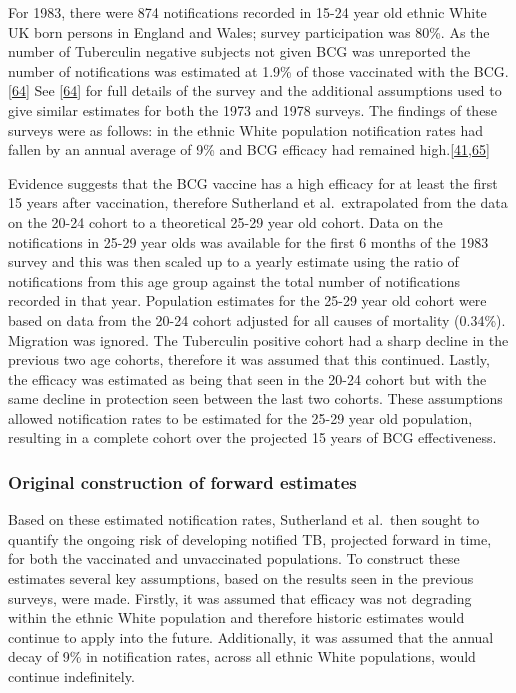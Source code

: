 \documentclass[11pt,twoside]{bristolthesis}
\begin{document}
  For 1983, there were 874 notifications recorded in 15-24 year old ethnic White UK born persons in England and Wales; survey participation was 80\%. As the number of Tuberculin negative subjects not given BCG was unreported the number of notifications was estimated at 1.9\% of those vaccinated with the BCG.{[}\protect\hyperlink{ref-Sutherland1987a}{64}{]} See {[}\protect\hyperlink{ref-Sutherland1987a}{64}{]} for full details of the survey and the additional assumptions used to give similar estimates for both the 1973 and 1978 surveys. The findings of these surveys were as follows: in the ethnic White population notification rates had fallen by an annual average of 9\% and BCG efficacy had remained high.{[}\protect\hyperlink{ref-Sutherland1989}{41},\protect\hyperlink{ref-Springett1988}{65}{]}
  
  Evidence suggests that the BCG vaccine has a high efficacy for at least the first 15 years after vaccination, therefore Sutherland et al.~extrapolated from the data on the 20-24 cohort to a theoretical 25-29 year old cohort. Data on the notifications in 25-29 year olds was available for the first 6 months of the 1983 survey and this was then scaled up to a yearly estimate using the ratio of notifications from this age group against the total number of notifications recorded in that year. Population estimates for the 25-29 year old cohort were based on data from the 20-24 cohort adjusted for all causes of mortality (0.34\%). Migration was ignored. The Tuberculin positive cohort had a sharp decline in the previous two age cohorts, therefore it was assumed that this continued. Lastly, the efficacy was estimated as being that seen in the 20-24 cohort but with the same decline in protection seen between the last two cohorts. These assumptions allowed notification rates to be estimated for the 25-29 year old population, resulting in a complete cohort over the projected 15 years of BCG effectiveness.
  
  \hypertarget{original-construction-of-forward-estimates}{%
  \subsubsection{Original construction of forward estimates}\label{original-construction-of-forward-estimates}}
  
  Based on these estimated notification rates, Sutherland et al.~then sought to quantify the ongoing risk of developing notified TB, projected forward in time, for both the vaccinated and unvaccinated populations. To construct these estimates several key assumptions, based on the results seen in the previous surveys, were made. Firstly, it was assumed that efficacy was not degrading within the ethnic White population and therefore historic estimates would continue to apply into the future. Additionally, it was assumed that the annual decay of 9\% in notification rates, across all ethnic White populations, would continue indefinitely.
  
\end{document}
